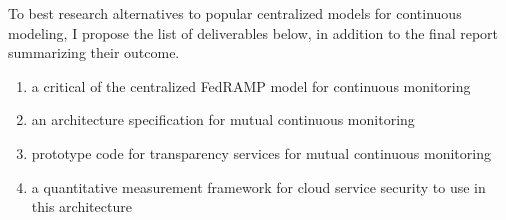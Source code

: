 \documentclass{jdf}
\begin{document}
To best research alternatives to popular centralized models for continuous modeling, I propose the list of deliverables below, in addition to the final report summarizing their outcome. 

\begin{enumerate}
    \item a critical of the centralized FedRAMP model for continuous monitoring
    \item an architecture specification for mutual continuous monitoring
    \item prototype code for transparency services for mutual continuous monitoring
    \item a quantitative measurement framework for cloud service security to use in this architecture
\end{enumerate}



\end{document}
